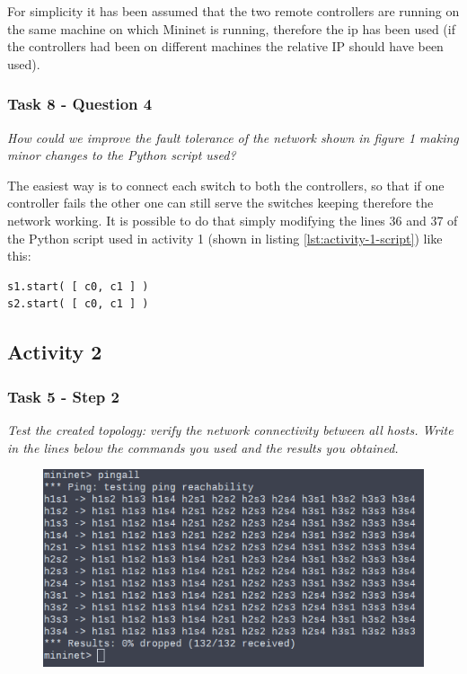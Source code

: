 For simplicity it has been assumed that the two remote controllers are running on the same machine on
which Mininet is running, therefore the ip  has been used (if the
controllers had been on different machines the relative IP should have been used).




\subsubsection*{Task 8 - Question 4}
\textit{How could we improve the fault tolerance of the network shown
in figure 1 making minor changes to the Python script used?}

The easiest way is to connect each switch to both the controllers, so that if
one controller fails the other one can still serve the switches keeping therefore
the network working. It is possible to do that simply modifying the lines 36 and 37 of
the Python script used in activity 1 (shown in listing \ref{lst:activity-1-script})
like this:

\begin{lstlisting}
s1.start( [ c0, c1 ] )
s2.start( [ c0, c1 ] )
\end{lstlisting}







\subsection*{Activity 2}
\subsubsection*{Task 5 - Step 2}
\textit{Test the created topology: verify the network connectivity between all hosts.
Write in the lines below the commands you used and the results you obtained.}
\begin{figure}[htb]
	\centering
	\includegraphics[width=0.8\linewidth]{img/activity-2-task-5-step-2.png}
\end{figure}


